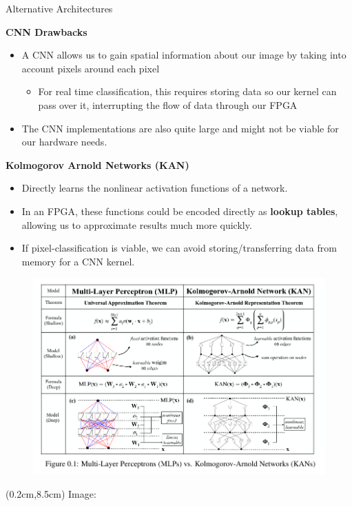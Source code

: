 \documentclass[aspectratio=169,xcolor=dvipsnames]{beamer}
\newcommand\myheading[1]{%
  \par\bigskip
  {\Large\bfseries#1}\par\smallskip}
\begin{document}
\begin{frame}{Alternative Architectures}
    \myheading{CNN Drawbacks}
    \begin{itemize}
        \item A CNN allows us to gain spatial information about our image by taking into account pixels around each pixel
              \begin{itemize}
                  \item For real time classification, this requires storing data so our kernel can pass over it, interrupting the flow of data through our FPGA
              \end{itemize}
        \item The CNN implementations are also quite large and might not be viable for our hardware needs.
    \end{itemize}


    \myheading{Kolmogorov Arnold Networks (KAN)}
    \begin{itemize}
        \item Directly learns the nonlinear activation functions of a network.
        \item In an FPGA, these functions could be encoded directly as \textbf{lookup tables}, allowing us to approximate results much more quickly.
        \item If pixel-classification is viable, we can avoid storing/transferring data from memory for a CNN kernel.
    \end{itemize}
\end{frame}

\begin{frame}
    \begin{figure}
        \includegraphics[width=0.75\linewidth]{mlpkan.png}
    \end{figure}


    \begin{textblock*}{5cm}(0.2cm,8.5cm)
        \tiny Image: \cite{kan}
    \end{textblock*}

\end{frame}
\end{document}

